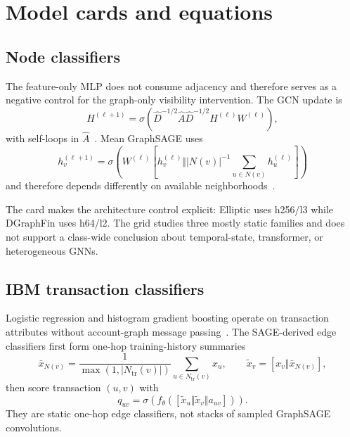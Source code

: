 \section{Model cards and equations}
\label{sec:s-models-v2}

\subsection{Node classifiers}

The feature-only MLP does not consume adjacency and therefore serves as a negative control for the graph-only visibility intervention. The GCN update is
\begin{equation}
 H^{(\ell+1)}
 =\sigma\!\left(\widehat D^{-1/2}\widehat A\widehat D^{-1/2}
 H^{(\ell)}W^{(\ell)}\right),
\end{equation}
with self-loops in \(\widehat A\)~\cite{kipf2017gcn}. Mean GraphSAGE uses
\begin{equation}
 h_v^{(\ell+1)}
 =\sigma\!\left(W^{(\ell)}
 [h_v^{(\ell)}\Vert |N(v)|^{-1}\!\sum_{u\in N(v)}h_u^{(\ell)}]\right)
\end{equation}
and therefore depends differently on available neighborhoods~\cite{hamilton2017graphsage}.



The card makes the architecture control explicit: Elliptic uses h256/l3 while DGraphFin uses h64/l2. The grid studies three mostly static families and does not support a class-wide conclusion about temporal-state, transformer, or heterogeneous GNNs.

\subsection{IBM transaction classifiers}

Logistic regression and histogram gradient boosting operate on transaction attributes without account-graph message passing~\cite{friedman2001gbm}. The SAGE-derived edge classifiers first form one-hop training-history summaries
\begin{equation}
 \bar x_{N(v)}
 =\frac{1}{\max(1,|N_{\mathrm{tr}}(v)|)}
 \sum_{u\in N_{\mathrm{tr}}(v)}x_u,
 \qquad
 \widetilde x_v=[x_v\Vert\bar x_{N(v)}],
\end{equation}
then score transaction \((u,v)\) with
\begin{equation}
 q_{uv}=\sigma\!\left(f_\theta(
 [\widetilde x_u\Vert\widetilde x_v\Vert a_{uv}])\right).
\end{equation}
They are static one-hop edge classifiers, not stacks of sampled GraphSAGE convolutions.

